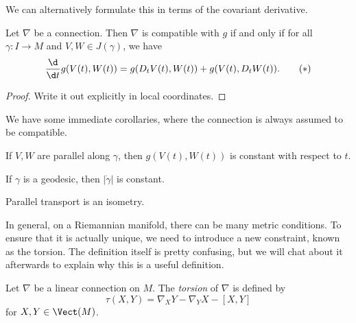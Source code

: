 \documentclass[a4paper]{article}
\begin{document}
We can alternatively formulate this in terms of the covariant derivative.
\begin{lemma}
  Let $\nabla$ be a connection. Then $\nabla$ is compatible with $g$ if and only if for all $\gamma: I \to M$ and $V, W \in J(\gamma)$, we have
  \[
    \frac{\d}{\d t}g(V(t), W(t)) = g(D_t V(t), W(t)) + g(V(t), D_t W(t)).\tag{$*$}
  \]
\end{lemma}

\begin{proof}
%
  Write it out explicitly in local coordinates.
\end{proof}

We have some immediate corollaries, where the connection is always assumed to be compatible.
\begin{cor}
  If $V, W$ are parallel along $\gamma$, then $g(V(t), W(t))$ is constant with respect to $t$.
\end{cor}

\begin{cor}
  If $\gamma$ is a geodesic, then $|\dot{\gamma}|$ is constant.
\end{cor}

\begin{cor}
  Parallel transport is an isometry.
\end{cor}

In general, on a Riemannian manifold, there can be many metric conditions. To ensure that it is actually unique, we need to introduce a new constraint, known as the torsion. The definition itself is pretty confusing, but we will chat about it afterwards to explain why this is a useful definition.

\begin{defi}
  Let $\nabla$ be a linear connection on $M$. The \emph{torsion} of $\nabla$ is defined by
  \[
    \tau(X, Y) = \nabla_X Y - \nabla_Y X - [X, Y]
  \]
  for $X, Y \in \Vect(M)$.
\end{defi}
\end{document}
